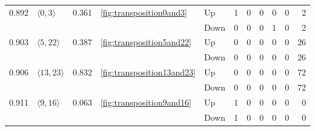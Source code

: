 \documentclass{article}
\begin{document}
\begin{center}
\begin{tabular}{lllllrrrrrr}
\multirow[t]{2}{*}{0.892} & \multirow[t]{2}{*}{$\langle0, 3\rangle$} & \multirow[t]{2}{*}{0.361} & \multirow[t]{2}{*}{\ref{fig:transposition0and3}} & Up & 1 & 0 & 0 & 0 & 0 & 2 \\
 &  &  &  & Down & 0 & 0 & 0 & 1 & 0 & 2 \\
\cline{1-11} \cline{2-11} \cline{3-11} \cline{4-11}
\multirow[t]{2}{*}{0.903} & \multirow[t]{2}{*}{$\langle5, 22\rangle$} & \multirow[t]{2}{*}{0.387} & \multirow[t]{2}{*}{\ref{fig:transposition5and22}} & Up & 0 & 0 & 0 & 0 & 0 & 26 \\
 &  &  &  & Down & 0 & 0 & 0 & 0 & 0 & 26 \\
\cline{1-11} \cline{2-11} \cline{3-11} \cline{4-11}
\multirow[t]{2}{*}{0.906} & \multirow[t]{2}{*}{$\langle13, 23\rangle$} & \multirow[t]{2}{*}{0.832} & \multirow[t]{2}{*}{\ref{fig:transposition13and23}} & Up & 0 & 0 & 0 & 0 & 0 & 72 \\
 &  &  &  & Down & 0 & 0 & 0 & 0 & 0 & 72 \\
\cline{1-11} \cline{2-11} \cline{3-11} \cline{4-11}
\multirow[t]{2}{*}{0.911} & \multirow[t]{2}{*}{$\langle9, 16\rangle$} & \multirow[t]{2}{*}{0.063} & \multirow[t]{2}{*}{\ref{fig:transposition9and16}} & Up & 1 & 0 & 0 & 0 & 0 & 0 \\
 &  &  &  & Down & 1 & 0 & 0 & 0 & 0 & 0 \\
\cline{1-11} \cline{2-11} \cline{3-11} \cline{4-11}
\bottomrule
\end{tabular}


\end{center}
\end{document}
